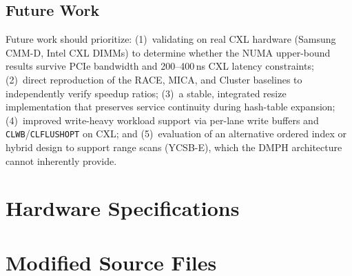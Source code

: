 \documentclass[conference]{IEEEtran}
\begin{document}
\subsection{Future Work}

Future work should prioritize: (1)~validating on real CXL hardware (Samsung CMM-D, Intel CXL DIMMs) to determine whether the NUMA upper-bound results survive PCIe bandwidth and 200--400\,ns CXL latency constraints; (2)~direct reproduction of the RACE, MICA, and Cluster baselines to independently verify speedup ratios; (3)~a stable, integrated resize implementation that preserves service continuity during hash-table expansion; (4)~improved write-heavy workload support via per-lane write buffers and \texttt{CLWB}/\texttt{CLFLUSHOPT} on CXL; and (5)~evaluation of an alternative ordered index or hybrid design to support range scans (YCSB-E), which the DMPH architecture cannot inherently provide.

\appendices
\section{Hardware Specifications}\label{app:hw}

\begin{table}[H]
\centering
\caption{Hardware comparison}
\label{tab:hw}
\scriptsize
{}
\end{table}

\section{Modified Source Files}
\end{document}
